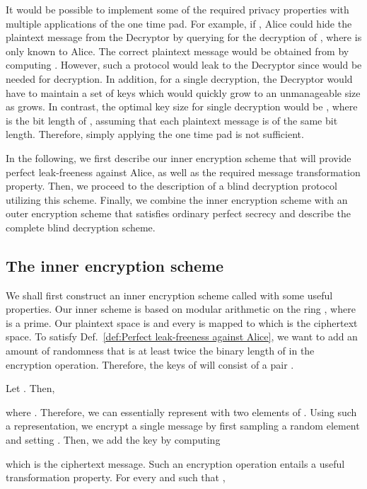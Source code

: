 \documentclass[10pt,journal]{IEEEtran}
\begin{document}
It would be possible to implement some of the required privacy properties
with multiple applications of the one time pad.
For example, if , Alice could hide
the plaintext message from the Decryptor by querying for the decryption of , where  is only known to Alice.
The correct plaintext message would be obtained from 
by computing .
However, such a protocol would leak  to the Decryptor since  would be needed for decryption. In addition,
for a single decryption, the Decryptor would have to maintain a set of 
keys which would quickly grow to an unmanageable size as  grows.
In contrast, the optimal key size for single decryption would be , where  is
the bit length of , assuming that each
plaintext message is of the same bit length.
Therefore, simply applying the one time pad is not sufficient.





In the following, we first describe our inner encryption scheme  that will provide perfect leak-freeness against Alice,
as well as the required message transformation property.
Then, we proceed to the description of a blind decryption protocol utilizing this scheme. 
Finally, we combine the inner encryption scheme with an outer encryption scheme that satisfies
ordinary perfect secrecy and describe the complete blind decryption scheme.

\subsection{The inner encryption scheme}

We shall first construct an inner encryption scheme called 
with some useful properties.
Our inner scheme is based on modular arithmetic on the ring , where 
is a prime. Our plaintext space is  and every  is mapped to 
 which is the ciphertext space.
To satisfy Def.~\ref{def:Perfect leak-freeness against Alice}, we want to add an amount
of randomness that is at least twice the binary length of  in the encryption operation.
Therefore, the keys of  will consist of a pair .


Let . Then,

where .
Therefore, we can essentially represent  with two elements of .
Using such a representation, we encrypt a single message  by
first sampling a random element  and
setting
. Then, we add the key  by computing

which is the ciphertext message. Such an encryption operation
entails a useful transformation property.
For every  and  such that ,
\end{document}
